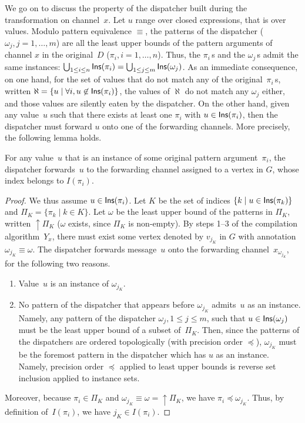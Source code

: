 \documentclass{LMCS}
\newcommand{\forget}[1]{}
\newcommand{\pt}{\pi}
\newcommand{\ptbis}{\omega}
\newcommand{\pts}{\Pi}
\newcommand{\ins}[1]{{\sf Ins}(#1)}
\newcommand{\set}[1]{\{#1\}}
\newcommand{\lubop}{\mathop{\uparrow}}
\renewcommand{\_}{\mathord{\rule[-.25ex]{1ex}{.15ex}}}
\newcommand{\preds}[1]{I(#1)}
\begin{document}
We go on to discuss the property of the dispatcher built during the
transformation on channel~$x$. Let $u$ range over closed expressions,
that is over values. Modulo pattern equivalence $\equiv$, the patterns
of the dispatcher ($\ptbis_j, j=1,\ldots,m$) are all the least upper
bounds of the pattern arguments of channel $x$ in the original~$D$
($\pt_i, i=1,\ldots,n$). Thus, the $\pt_i$\,s and the $\ptbis_j$\,s
admit the same instances: $\bigcup_{1 \leq i \leq n} \ins{\pt_i} =
\bigcup_{1 \leq j \leq m} \ins{\ptbis_j}$.  As an immediate
consequence, on one hand, for the set of values that do not match any
of the original~$\pt_i$\,s, written $\aleph = \{ u \mid \forall i, u
\not\in \ins{\pt_i}\}$, the values of $\aleph$ do not match
any $\ptbis_j$ either, and those values are silently eaten by the
dispatcher. On the other
hand, given any value~$u$ such that there exists at least one $\pt_i$
with $u \in \ins{\pt_i}$, then the dispatcher must forward $u$ onto
one of the forwarding channels. More precisely, the following lemma holds.
\begin{lem}\label{lemma.joinpi.dispatcher}
  For any value~$u$ that is an instance of some original pattern
  argument~$\pt_i$, the dispatcher forwards~$u$ to the forwarding
  channel assigned to a vertex in $G$, whose index belongs to
  $\preds{\pt_i}$.
\end{lem}
\begin{proof}
  We thus assume $u \in \ins{\pt_i}$.  Let $K$ be the set of indices $\{ k
  \mid u \in \ins{\pt_k} \}$ and $\pts_{K} = \set{\pt_k \mid k\in K}$. Let
  $\ptbis$ be the least upper bound of the patterns in
  $\pts_{K}$, written $\lubop{\pts_K}$ ($\ptbis$ exists, since
  $\pts_{K}$ is non-empty).  By steps 1--3 of
  the compilation algorithm~$Y_x$, there must exist some vertex denoted by
  $v_{j_{K}}$ in $G$ with annotation $\ptbis_{j_{K}} \equiv \ptbis$.    
  The dispatcher forwards message~$u$ onto the forwarding
  channel~$x_{\ptbis_{j_{K}}}$, for the following two
  reasons.
  \begin{enumerate}[(1)]
  \item Value~$u$ is an instance of $\ptbis_{j_{K}}$.
  \item No pattern of the dispatcher that appears before
  $\ptbis_{j_{K}}$ admits~$u$ as an instance.
  Namely, any pattern of the dispatcher $\ptbis_{j}, 1\leq j \leq m$,
  such that $u\in\ins{\ptbis_j}$ must be the least upper
  bound of a subset of~$\pts_K$. Then, since the
  patterns of the dispatchers are ordered topologically (with
  precision order $\preceq$), $\ptbis_{j_K}$ must be the foremost
  pattern in the dispatcher which has $u$ as an instance.
  Namely, precision order $\preceq$ applied to least upper bounds is
  reverse set inclusion applied to instance sets.
  \end{enumerate}
  Moreover, because $\pt_i\in\pts_K$ and $\ptbis_{j_K} \equiv \ptbis =
  \lubop\pts_K$, we have $\pt_i \preceq \ptbis_{j_{K}}$.
  Thus, by definition of~$I(\pt_i)$, we have $j_{K} \in I(\pt_i)$. \forget{\qed}
\end{proof}
\end{document}
